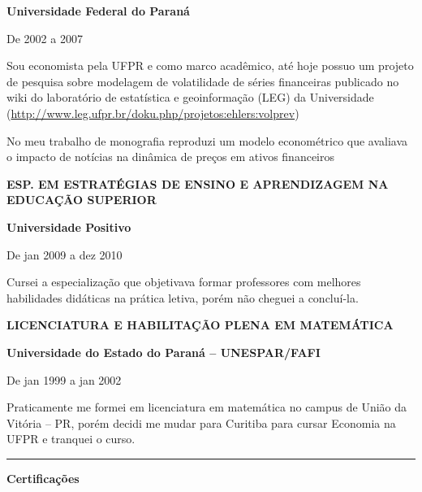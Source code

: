 \documentclass{article}
\begin{document}
\vspace{.25cm}
\textbf{Universidade Federal do Paraná}

De 2002 a 2007

\vspace{.25cm}

\hspace{-.47cm}Sou economista pela UFPR e como marco acadêmico, até hoje possuo um projeto de pesquisa sobre modelagem de volatilidade de séries financeiras publicado no wiki do laboratório de estatística e geoinformação (LEG) da Universidade (\href{http://www.leg.ufpr.br/doku.php/projetos:ehlers:volprev}{http://www.leg.ufpr.br/doku.php/projetos:ehlers:volprev})  

\hspace{-.47cm}No meu trabalho de monografia reproduzi um modelo econométrico que avaliava o impacto de notícias na dinâmica de preços em ativos financeiros

\vspace{.25cm}


\hspace{-.45cm}\textbf{ESP. EM ESTRATÉGIAS DE ENSINO E APRENDIZAGEM NA EDUCAÇÃO SUPERIOR}

\vspace{.25cm}

\textbf{Universidade Positivo}

De jan 2009 a dez 2010

\begin{flushleft}
Cursei a especialização que objetivava formar professores com melhores habilidades didáticas na prática letiva, porém não cheguei a concluí-la. 

\end{flushleft}
\vspace{.25cm}

\hspace{-.45cm}\textbf{LICENCIATURA E HABILITAÇÃO PLENA EM MATEMÁTICA}
\vspace{.25cm}

\textbf{Universidade do Estado do Paraná – UNESPAR/FAFI}

De jan 1999 a jan 2002

\begin{flushleft}
Praticamente me formei em licenciatura em matemática no campus de União da Vitória – PR, porém decidi me mudar para Curitiba para cursar Economia na UFPR e tranquei o curso.
\end{flushleft}

\rule[6cm]{6in}{0.1pt} 
\vspace{-6cm}
\begin{center}
\textbf{Certificações}
\end{center}
\end{document}
